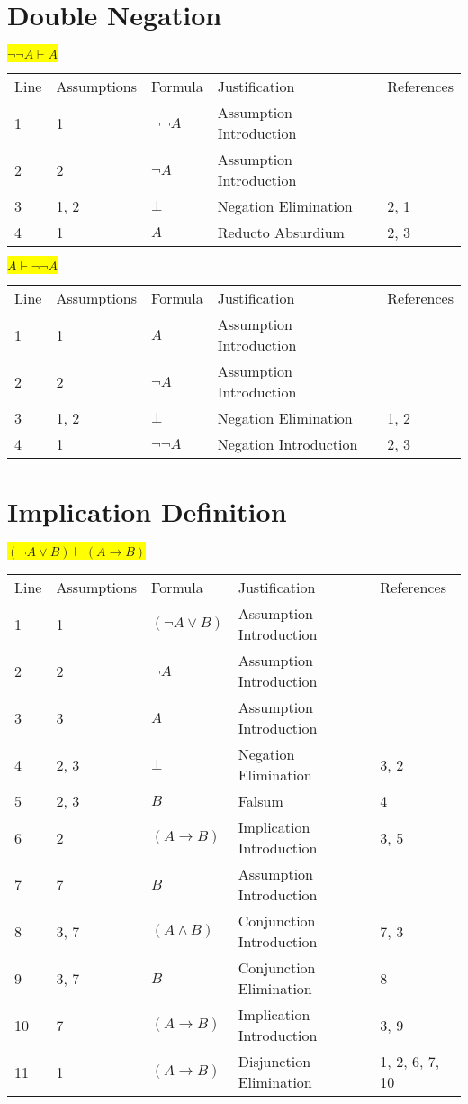 \documentclass[12pt]{article}
\newcommand{\pr}[1]{\bigbreak \colorbox{Yellow}{$#1$} \smallbreak}
\begin{document}
\begin{flushleft}
\section{Double Negation}
\pr{\neg \neg A \vdash A}
\begin{tabular}{lllll}
    Line & Assumptions & Formula & Justification & References \\
    1 & 1 & $\neg \neg A$  & Assumption Introduction &  \\
    2 & 2 & $\neg A$  & Assumption Introduction &  \\
    3 & 1, 2 & $\bot $  & Negation Elimination & 2, 1 \\
    4 & 1 & $A$  & Reducto Absurdium & 2, 3 \\
\end{tabular}

\pr{A \vdash \neg \neg A}
\begin{tabular}{lllll}
    Line & Assumptions & Formula & Justification & References \\
    1 & 1 & $A$  & Assumption Introduction &  \\
    2 & 2 & $\neg A$  & Assumption Introduction &  \\
    3 & 1, 2 & $\bot $  & Negation Elimination & 1, 2 \\
    4 & 1 & $\neg \neg A$  & Negation Introduction & 2, 3 \\
\end{tabular}

\section{Implication Definition}
\pr{(\neg A\lor B) \vdash (A \rightarrow B)}
\begin{tabular}{lllll}
    Line & Assumptions & Formula & Justification & References \\
    1 & 1 & $(\neg A\lor B)$  & Assumption Introduction &  \\
    2 & 2 & $\neg A$  & Assumption Introduction &  \\
    3 & 3 & $A$  & Assumption Introduction &  \\
    4 & 2, 3 & $\bot $  & Negation Elimination & 3, 2 \\
    5 & 2, 3 & $B$  & Falsum & 4 \\
    6 & 2 & $(A\rightarrow B)$  & Implication Introduction & 3, 5 \\
    7 & 7 & $B$  & Assumption Introduction &  \\
    8 & 3, 7 & $(A\land B)$  & Conjunction Introduction & 7, 3 \\
    9 & 3, 7 & $B$  & Conjunction Elimination & 8 \\
    10 & 7 & $(A\rightarrow B)$  & Implication Introduction & 3, 9 \\
    11 & 1 & $(A\rightarrow B)$  & Disjunction Elimination & 1, 2, 6, 7, 10 \\
\end{tabular}


\end{flushleft}
\end{document}
